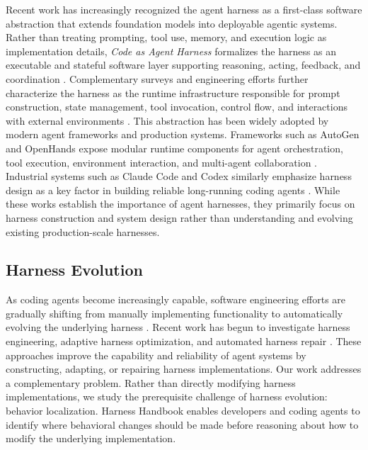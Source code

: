 \documentclass[]{ailab}
\begin{document}
Recent work has increasingly recognized the agent harness as a first-class software abstraction that extends foundation models into deployable agentic systems. Rather than treating prompting, tool use, memory, and execution logic as implementation details, \emph{Code as Agent Harness} formalizes the harness as an executable and stateful software layer supporting reasoning, acting, feedback, and coordination \citep{ning2026code}. Complementary surveys and engineering efforts further characterize the harness as the runtime infrastructure responsible for prompt construction, state management, tool invocation, control flow, and interactions with external environments \citep{meng2026agent,he2026harness}. This abstraction has been widely adopted by modern agent frameworks and production systems. Frameworks such as AutoGen and OpenHands expose modular runtime components for agent orchestration, tool execution, environment interaction, and multi-agent collaboration \citep{wu2023autogen,wang2025openhands}. Industrial systems such as Claude Code and Codex similarly emphasize harness design as a key factor in building reliable long-running coding agents \citep{rajasekaran2026harness,openai2025codex}. While these works establish the importance of agent harnesses, they primarily focus on harness construction and system design rather than understanding and evolving existing production-scale harnesses.

\subsection{Harness Evolution}

As coding agents become increasingly capable, software engineering efforts are gradually shifting from manually implementing functionality to automatically evolving the underlying harness \citep{yang2024swe,wang2025openhands}. Recent work has begun to investigate harness engineering, adaptive harness optimization, and automated harness repair \citep{zhong2026ai,zhu2026semaclaw,lin2026agentic,chen2026harnessx,chen2026harnessforge,chen2026failed}. These approaches improve the capability and reliability of agent systems by constructing, adapting, or repairing harness implementations. Our work addresses a complementary problem. Rather than directly modifying harness implementations, we study the prerequisite challenge of harness evolution: behavior localization. Harness Handbook enables developers and coding agents to identify where behavioral changes should be made before reasoning about how to modify the underlying implementation.
\end{document}

